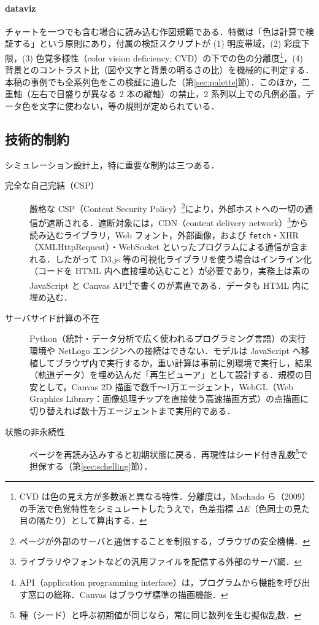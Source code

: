 \documentclass[a4paper]{jlreq}
\begin{document}
\paragraph{dataviz}
チャートを一つでも含む場合に読み込む作図規範である．特徴は「色は計算で検証する」という原則にあり，付属の検証スクリプトが (1) 明度帯域，(2) 彩度下限，(3) 色覚多様性（color vision deficiency; CVD）の下での色の分離度\footnote{CVD は色の見え方が多数派と異なる特性．分離度は，Machado ら（2009）の手法で色覚特性をシミュレートしたうえで，色差指標 $\Delta E$（色同士の見た目の隔たり）として算出する．}，(4) 背景とのコントラスト比（図や文字と背景の明るさの比）を機械的に判定する．本稿の事例でも全系列色をこの検証に通した（第\ref{sec:palette}節）．このほか，二重軸（左右で目盛りが異なる 2 本の縦軸）の禁止，2 系列以上での凡例必置，データ色を文字に使わない，等の規則が定められている．

\subsection{技術的制約}\label{sec:constraints}

シミュレーション設計上，特に重要な制約は三つある．

\begin{description}
  \item[完全な自己完結（CSP）] 厳格な CSP（Content Security Policy）\footnote{ページが外部のサーバと通信することを制限する，ブラウザの安全機構．}により，外部ホストへの一切の通信が遮断される．遮断対象には，CDN（content delivery network）\footnote{ライブラリやフォントなどの汎用ファイルを配信する外部のサーバ網．}から読み込むライブラリ，Web フォント，外部画像，および \texttt{fetch}・XHR（XMLHttpRequest）・WebSocket といったプログラムによる通信が含まれる．したがって D3.js 等の可視化ライブラリを使う場合はインライン化（コードを HTML 内へ直接埋め込むこと）が必要であり，実務上は素の JavaScript と Canvas API\footnote{API（application programming interface）は，プログラムから機能を呼び出す窓口の総称．Canvas はブラウザ標準の描画機能．}で書くのが素直である．データも HTML 内に埋め込む．
  \item[サーバサイド計算の不在] Python（統計・データ分析で広く使われるプログラミング言語）の実行環境や NetLogo エンジンへの接続はできない．モデルは JavaScript へ移植してブラウザ内で実行するか，重い計算は事前に別環境で実行し，結果（軌道データ）を埋め込んだ「再生ビューア」として設計する．規模の目安として，Canvas 2D 描画で数千〜1万エージェント，WebGL（Web Graphics Library：画像処理チップを直接使う高速描画方式）の点描画に切り替えれば数十万エージェントまで実用的である．
  \item[状態の非永続性] ページを再読み込みすると初期状態に戻る．再現性はシード付き乱数\footnote{種（シード）と呼ぶ初期値が同じなら，常に同じ数列を生む擬似乱数．}で担保する（第\ref{sec:schelling}節）．
\end{description}
\end{document}
